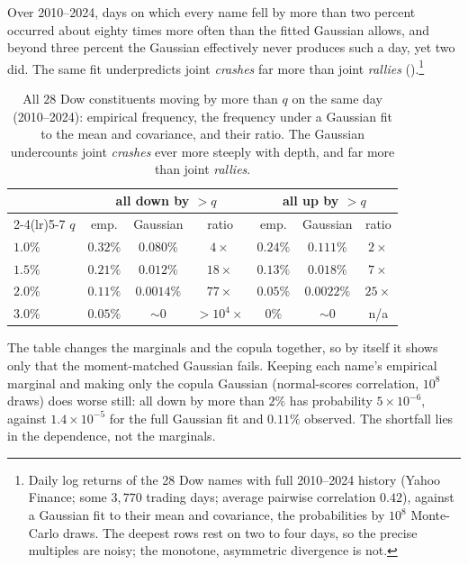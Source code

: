 Over 2010--2024, days on which every name fell by more than two percent occurred
about eighty times more often than the fitted Gaussian allows, and beyond three
percent the Gaussian effectively never produces such a day, yet two did. The same
fit underpredicts joint \emph{crashes} far more than joint \emph{rallies}
().\footnote{Daily log returns of
the 28 Dow names with full 2010--2024 history (Yahoo Finance; some $3{,}770$ trading days; average pairwise
correlation $0.42$), against a Gaussian fit to their mean and covariance, the
probabilities by $10^{8}$ Monte-Carlo draws. The deepest rows rest on two to four
days, so the precise multiples are noisy; the monotone, asymmetric divergence is
not.}

\begin{table}[ht]
  \centering
  \caption{All $28$ Dow constituents moving by more than $q$ on the same day
  (2010--2024): empirical frequency, the frequency under a Gaussian fit to the
  mean and covariance, and their ratio. The Gaussian undercounts joint
  \emph{crashes} ever more steeply with depth, and far more than joint
  \emph{rallies}.}
  \label{tab:tail}
  \begin{tabular}{lccc@{\qquad}ccc}
    \toprule
    & \multicolumn{3}{c}{all down by ${>}q$} & \multicolumn{3}{c}{all up by ${>}q$} \\
    \cmidrule(lr){2-4}\cmidrule(lr){5-7}
    $q$ & emp. & Gaussian & ratio & emp. & Gaussian & ratio \\
    \midrule
    $1.0\%$ & $0.32\%$ & $0.080\%$  & $4\times$         & $0.24\%$ & $0.111\%$  & $2\times$  \\
    $1.5\%$ & $0.21\%$ & $0.012\%$  & $18\times$        & $0.13\%$ & $0.018\%$  & $7\times$  \\
    $2.0\%$ & $0.11\%$ & $0.0014\%$ & $77\times$        & $0.05\%$ & $0.0022\%$ & $25\times$ \\
    $3.0\%$ & $0.05\%$ & ${\sim}0$  & ${>}10^{4}\times$ & $0\%$    & ${\sim}0$  & n/a        \\
    \bottomrule
  \end{tabular}
\end{table}

The table changes the marginals and the copula together, so by itself it shows
only that the moment-matched Gaussian fails. Keeping each name's empirical marginal
and making only the copula Gaussian (normal-scores correlation, $10^8$ draws) does
worse still: all down by more than $2\%$ has probability $5\times10^{-6}$, against
$1.4\times10^{-5}$ for the full Gaussian fit and $0.11\%$ observed. The shortfall
lies in the dependence, not the marginals.

